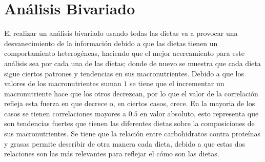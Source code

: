 \documentclass[12pt,a4paper]{article}
\begin{document}
    \section{Análisis Bivariado}\label{sec:biva}
    {
        El realizar un análisis bivariado usando todas las dietas va a 
        provocar una desvanecimiento de la información debido a que las dietas 
        tienen un comportamiento heterogéneas, haciendo que el mejor 
        acercamiento para este análisis sea por cada una de las dietas; 
        donde de nuevo se muestra que cada dieta sigue ciertos patrones 
        y tendencias en sus macronutrientes. Debido a que los valores 
        de los macronutrientes suman $1$ se tiene que el incrementar 
        un macronutriente hace que los otros decrezcan, por lo que el 
        valor de la correlación refleja esta fuerza en que decrece o, 
        en ciertos casos, crece. En la mayoria de los casos se tienen 
        correlaciones mayores a $0.5$ en valor absoluto, esto representa 
        que son tendencias fuertes que tienen las diferentes dietas sobre 
        la composiciones de sus macronutrientes. Se tiene que la relación 
        entre carbohidratos contra proteínas y grasas permite describir de 
        otra manera cada dieta, debido a que estas dos relaciones son las 
        más relevantes para reflejar el cómo son las dietas.

}
\end{document}
